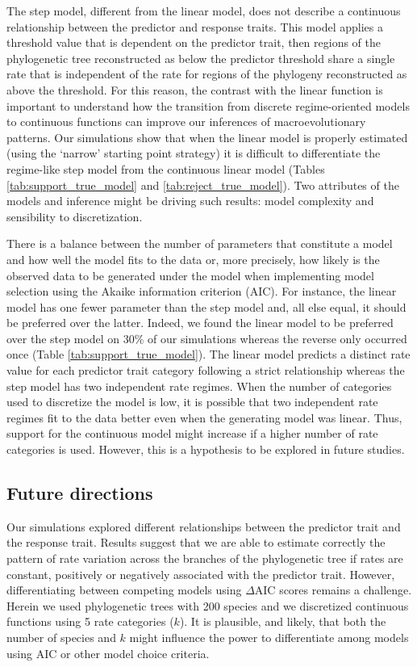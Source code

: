 The step model, different from the linear model, does not describe a continuous relationship between the predictor and response traits. This model applies a threshold value that is dependent on the predictor trait, then regions of the phylogenetic tree reconstructed as below the predictor threshold share a single rate that is independent of the rate for regions of the phylogeny reconstructed as above the threshold. For this reason, the contrast with the linear function is important to understand how the transition from discrete regime-oriented models to continuous functions can improve our inferences of macroevolutionary patterns. Our simulations show that when the linear model is properly estimated (using the `narrow' starting point strategy) it is difficult to differentiate the regime-like step model from the continuous linear model (Tables \ref{tab:support_true_model} and \ref{tab:reject_true_model}). Two attributes of the models and inference might be driving such results: model complexity and sensibility to discretization.

There is a balance between the number of parameters that constitute a model and how well the model fits to the data or, more precisely, how likely is the observed data to be generated under the model when implementing model selection using the Akaike information criterion (AIC). For instance, the linear model has one fewer parameter than the step model and, all else equal, it should be preferred over the latter. Indeed, we found the linear model to be preferred over the step model on 30\% of our simulations whereas the reverse only occurred once (Table \ref{tab:support_true_model}). The linear model predicts a distinct rate value for each predictor trait category following a strict relationship whereas the step model has two independent rate regimes. When the number of categories used to discretize the model is low, it is possible that two independent rate regimes fit to the data better even when the generating model was linear. Thus, support for the continuous model might increase if a higher number of rate categories is used. However, this is a hypothesis to be explored in future studies.

\subsection{Future directions}

Our simulations explored different relationships between the predictor trait and the response trait. Results suggest that we are able to estimate correctly the pattern of rate variation across the branches of the phylogenetic tree if rates are constant, positively or negatively associated with the predictor trait. However, differentiating between competing models using $\Delta$AIC scores remains a challenge. Herein we used phylogenetic trees with 200 species and we discretized continuous functions using 5 rate categories ($\mathit{k}$). It is plausible, and likely, that both the number of species and $\mathit{k}$ might influence the power to differentiate among models using AIC or other model choice criteria.


